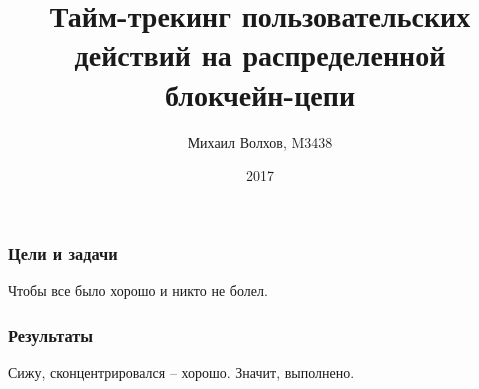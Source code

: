 \documentclass[11pt,handout,pdf,hyperref={unicode}]{beamer}
\title{Тайм-трекинг пользовательских действий на распределенной блокчейн-цепи}
\author{Михаил Волхов, M3438}
\institute{Санкт-Петербург, Университет ИТМО}
\date{2017}
\begin{document}
\frame{\titlepage}

\begin{frame}
  \frametitle{Цели и задачи}
  Чтобы все было хорошо и никто не болел.
\end{frame}

\begin{frame}
  \frametitle{Результаты}
  Сижу, сконцентрировался -- хорошо. Значит, выполнено.
\end{frame}
\end{document}
